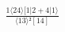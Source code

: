 \documentclass[varwidth, border=5pt]{standalone}
\begin{document}
\begin{my}
$\begin{gathered}
\scriptscriptstyle\frac{1⟨24⟩[1|2+4|1⟩}{⟨13⟩²[14]}
\end{gathered}$
\end{my}
\end{document}
